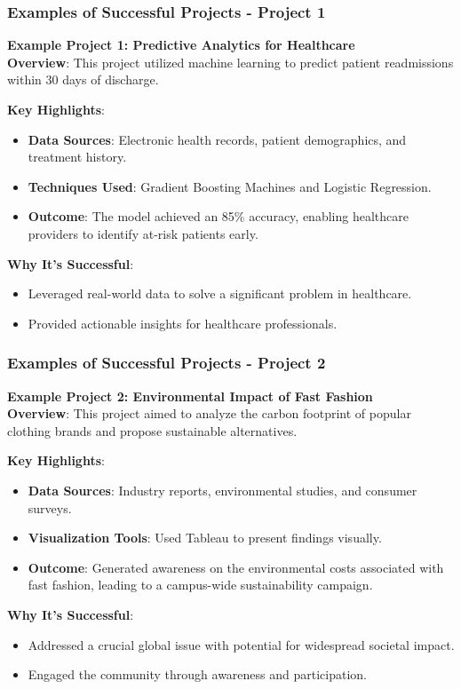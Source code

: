\documentclass[aspectratio=169]{beamer}
\begin{document}
\begin{frame}[fragile]
    \frametitle{Examples of Successful Projects - Project 1}
    \textbf{Example Project 1: Predictive Analytics for Healthcare} \\
    \textbf{Overview}: This project utilized machine learning to predict patient readmissions within 30 days of discharge.
    
    \textbf{Key Highlights}:
    \begin{itemize}
        \item \textbf{Data Sources}: Electronic health records, patient demographics, and treatment history.
        \item \textbf{Techniques Used}: Gradient Boosting Machines and Logistic Regression.
        \item \textbf{Outcome}: The model achieved an 85\% accuracy, enabling healthcare providers to identify at-risk patients early.
    \end{itemize}
    
    \textbf{Why It’s Successful}:
    \begin{itemize}
        \item Leveraged real-world data to solve a significant problem in healthcare.
        \item Provided actionable insights for healthcare professionals.
    \end{itemize}
\end{frame}

\begin{frame}[fragile]
    \frametitle{Examples of Successful Projects - Project 2}
    \textbf{Example Project 2: Environmental Impact of Fast Fashion} \\
    \textbf{Overview}: This project aimed to analyze the carbon footprint of popular clothing brands and propose sustainable alternatives.
    
    \textbf{Key Highlights}:
    \begin{itemize}
        \item \textbf{Data Sources}: Industry reports, environmental studies, and consumer surveys.
        \item \textbf{Visualization Tools}: Used Tableau to present findings visually.
        \item \textbf{Outcome}: Generated awareness on the environmental costs associated with fast fashion, leading to a campus-wide sustainability campaign.
    \end{itemize}
    
    \textbf{Why It’s Successful}:
    \begin{itemize}
        \item Addressed a crucial global issue with potential for widespread societal impact.
        \item Engaged the community through awareness and participation.
    \end{itemize}
\end{frame}
\end{document}
